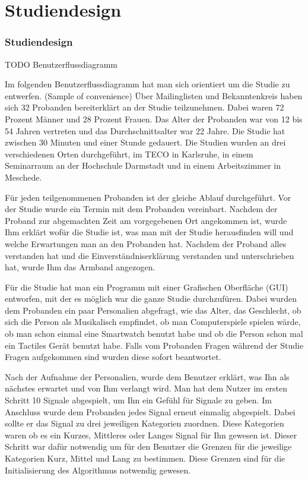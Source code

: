 
\chapter{Studiendesign}
\label{ch:Studiendesign}

\subsection{Studiendesign}
\label{ch:Evolution{\"a}rer Algorithmus:sec:Studiendesign}
TODO Benutzerflussdiagramm

Im folgenden Benutzerflussdiagramm hat man sich orientiert um die Studie zu entwerfen. (Sample of convenience) Über Mailinglisten und Bekanntenkreis haben sich 32 Probanden bereiterkl{\"a}rt an der Studie teilzunehmen. Dabei waren 72 Prozent Männer und 28 Prozent Frauen. Das Alter der Probanden war von 12 bis 54 Jahren vertreten und das Durchschnittsalter war 22 Jahre. Die Studie hat zwischen 30 Minuten und einer Stunde gedauert.
Die Studien wurden an drei verschiedenen Orten durchgef{\"u}hrt, im TECO in Karlsruhe, in einem Seminarraum an der Hochschule Darmstadt und in einem Arbeitszimmer in Meschede.

F{\"u}r jeden teilgenommenen Probanden ist der gleiche Ablauf durchgef{\"u}hrt. 
Vor der Studie wurde ein Termin mit dem Probanden vereinbart. Nachdem der Proband zur abgemachten Zeit am vorgegebenen Ort angekommen ist, wurde Ihm erkl{\"a}rt wof{\"u}r die Studie ist, was man mit der Studie herausfinden will und welche Erwartungen man an den Probanden hat. 
Nachdem der Proband alles verstanden hat und die Einverst{\"a}ndniserkl{\"a}rung verstanden und unterschrieben hat, wurde Ihm das Armband angezogen. 

F{\"u}r die Studie hat man ein Programm mit einer Grafischen Oberfl{\"a}che (GUI) entworfen, mit der es m{\"o}glich war die ganze Studie durchzuf{\"u}ren. 
Dabei wurden dem Probanden ein paar Personalien abgefragt, wie das Alter, das Geschlecht, ob sich die Person als Musikalisch empfindet, ob man Computerspiele spielen w{\"a}rde, ob man schon einmal eine Smartwatch benutzt habe und ob die Person schon mal ein Tactiles Ger{\"a}t benutzt habe. Falls vom Probanden Fragen w{\"a}hrend der Studie Fragen aufgekommen sind wurden diese sofort beantwortet. 

Nach der Aufnahme der Personalien, wurde dem Benutzer erkl{\"a}rt, was Ihn als n{\"a}chstes erwartet und von Ihm verlangt wird. 
Man hat dem Nutzer im ersten Schritt 10 Signale abgespielt, um Ihn ein Gef{\"u}hl f{\"u}r Signale zu geben. Im Anschluss wurde dem Probanden jedes Signal erneut einmalig abgespielt. Dabei sollte er das Signal zu drei jeweiligen Kategorien zuordnen. Diese Kategorien waren ob es ein Kurzes, Mittleres oder Langes Signal f{\"u}r Ihn gewesen ist. Dieser Schritt war daf{\"u}r notwendig um f{\"u}r den Benutzer die Grenzen f{\"u}r die jeweilige Kategorien Kurz, Mittel und Lang zu bestimmen. 
Diese Grenzen sind f{\"u}r die Initialisierung des Algorithmus notwendig gewesen. 


